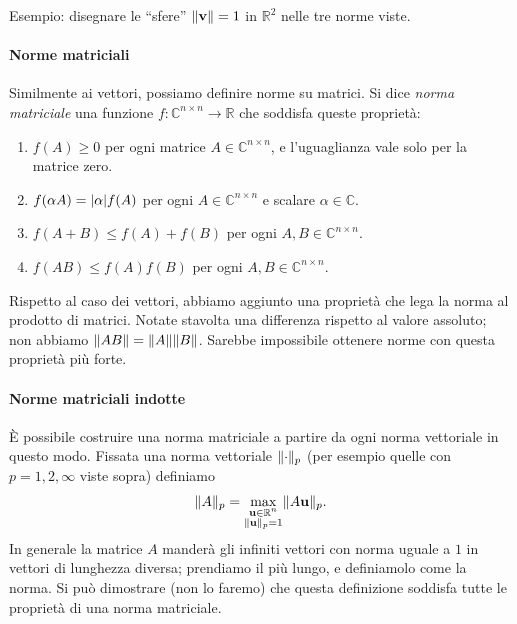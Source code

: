 \documentclass[a4paper]{report}
\DeclarePairedDelimiter{\abs}{\lvert}{\rvert}
\DeclarePairedDelimiter{\norm}{\lVert}{\rVert}
\theoremstyle{definition}
\theoremstyle{remark}
\begin{document}
Esempio: disegnare le ``sfere'' $\norm{\mathbf{v}}=1$ in $\mathbb{R}^2$ nelle tre norme viste.

\paragraph{Norme matriciali}

Similmente ai vettori, possiamo definire norme su matrici. Si dice \emph{norma matriciale} una funzione $f: \mathbb{C}^{n\times n} \to \mathbb{R}$ che soddisfa queste proprietà:
\begin{enumerate}
    \item $f(A) \geq 0$ per ogni matrice $A\in\mathbb{C}^{n\times n}$, e l'uguaglianza vale solo per la matrice zero.
    \item $f(\alpha A) = \abs{\alpha} f(A)$ per ogni $A\in\mathbb{C}^{n\times n}$ e scalare $\alpha \in \mathbb{C}$.
    \item $f(A+B) \leq f(A) + f(B)$ per ogni $A,B\in\mathbb{C}^{n\times n}$.
    \item $f(AB) \leq f(A)f(B)$ per ogni $A,B\in\mathbb{C}^{n\times n}$.
\end{enumerate}
Rispetto al caso dei vettori, abbiamo aggiunto una proprietà che lega la norma al prodotto di matrici. Notate stavolta una differenza rispetto al valore assoluto; non abbiamo $\norm{AB} = \norm{A}\norm{B}$. Sarebbe impossibile ottenere norme con questa proprietà più forte.

\paragraph{Norme matriciali indotte}

È possibile costruire una norma matriciale a partire da ogni norma vettoriale in questo modo. Fissata una norma vettoriale $\norm{\cdot}_p$ (per esempio quelle con $p = 1,2,\infty$ viste sopra) definiamo
\begin{equation} \label{normamatriciale}
    \norm{A}_p = \max_{\substack{\mathbf{u}\in\mathbb{R}^n \\ \norm{\mathbf{u}}_p=1}} \norm{A\mathbf{u}}_p.
\end{equation}
In generale la matrice $A$ manderà gli infiniti vettori con norma uguale a $1$ in vettori di lunghezza diversa; prendiamo il più lungo, e definiamolo come la norma. Si può dimostrare (non lo faremo) che questa definizione soddisfa tutte le proprietà di una norma matriciale.
\end{document}
